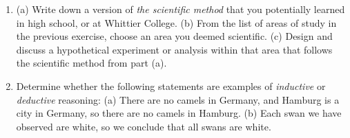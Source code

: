 \documentclass[12pt]{article}
\begin{document}
\begin{enumerate}
\item (a) Write down a version of \textit{the scientific method} that you potentially learned in high school, or at Whittier College. (b) From the list of areas of study in the previous exercise, choose an area you deemed scientific.  (c) Design and discuss a hypothetical experiment or analysis within that area that follows the scientific method from part (a). \\ \vspace{1.5cm}
\item Determine whether the following statements are examples of \textit{inductive} or \textit{deductive} reasoning: (a) There are no camels in Germany, and Hamburg is a city in Germany, so there are no camels in Hamburg. (b) Each swan we have observed are white, so we conclude that all swans are white.
\end{enumerate}
\end{document}
